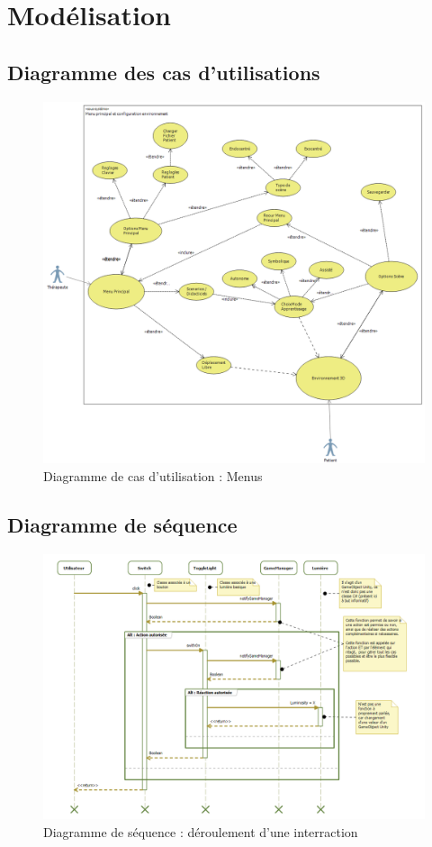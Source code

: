 \section{Modélisation}

\subsection{Diagramme des cas d’utilisations}
\begin{figure}[h]
    \centering
    \includegraphics[width=\textwidth]{4-Conception/img/diagCasUsage.png}
    \caption{Diagramme de cas d'utilisation : Menus}
\end{figure}

\subsection{Diagramme de séquence}
\begin{figure}[h]
    \centering
    \includegraphics[width=\textwidth]{4-Conception/img/diagSequenceLight.png}
    \caption{Diagramme de séquence : déroulement d'une interraction}
    \label{fig:sequence_diagram}
\end{figure}

